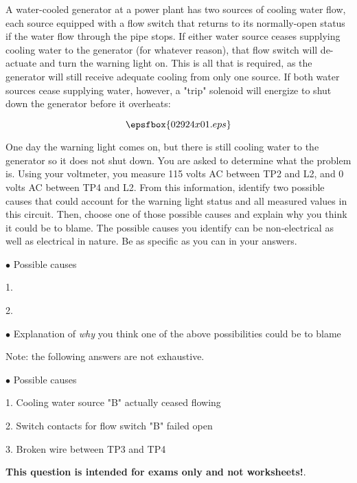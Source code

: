 

A water-cooled generator at a power plant has two sources of cooling water flow, each source equipped with a flow switch that returns to its normally-open status if the water flow through the pipe stops.  If either water source ceases supplying cooling water to the generator (for whatever reason), that flow switch will de-actuate and turn the warning light on.  This is all that is required, as the generator will still receive adequate cooling from only one source.  If both water sources cease supplying water, however, a "trip" solenoid will energize to shut down the generator before it overheats:

$$\epsfbox{02924x01.eps}$$

One day the warning light comes on, but there is still cooling water to the generator so it does not shut down.  You are asked to determine what the problem is.  Using your voltmeter, you measure 115 volts AC between TP2 and L2, and 0 volts AC between TP4 and L2.  From this information, identify two possible causes that could account for the warning light status and all measured values in this circuit.  Then, choose one of those possible causes and explain why you think it could be to blame.  The possible causes you identify can be non-electrical as well as electrical in nature.  Be as specific as you can in your answers.

\medskip
\goodbreak
\item{$\bullet$} Possible causes
\item{1.}
\item{2.} 
\medskip

\medskip
\goodbreak
\item{$\bullet$} Explanation of {\it why} you think one of the above possibilities could be to blame

\vskip 30pt







Note: the following answers are not exhaustive.

\medskip
\goodbreak
\item{$\bullet$} Possible causes
\item{1.} Cooling water source "B" actually ceased flowing
\item{2.} Switch contacts for flow switch "B" failed open
\item{3.} Broken wire between TP3 and TP4
\medskip







{\bf This question is intended for exams only and not worksheets!}.




